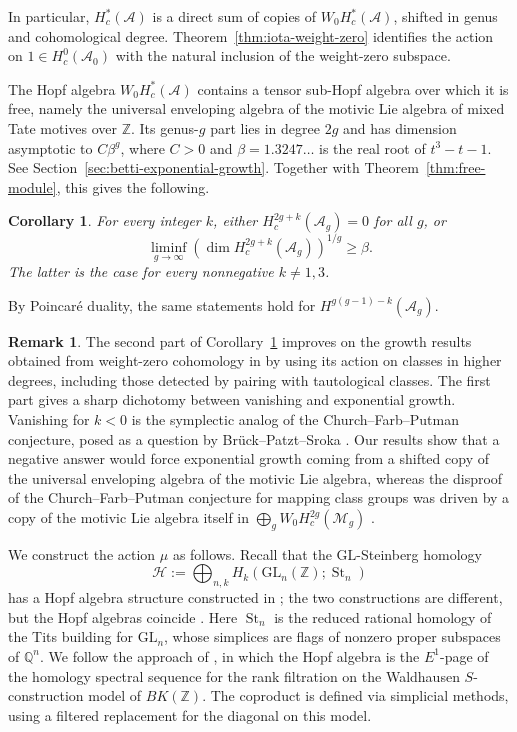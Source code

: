 \documentclass[12 pt]{amsart}
\newcommand{\QQ}{\mathbb{Q}}
\newcommand{\ZZ}{\mathbb{Z}}
\newcommand{\cA}{\mathcal{A}}
\newcommand{\cH}{\mathcal{H}}
\newcommand{\cM}{\mathcal{M}}
\newcommand{\St}{\operatorname{St}}
\newcommand{\GL}{\mathrm{GL}}
\newcommand{\<}{\langle}
\renewcommand{\>}{\rangle}
\newtheorem{corollary}[theorem]{Corollary}
\theoremstyle{definition}
\newtheorem{remark}[theorem]{Remark}
\begin{document}
\noindent In particular, $H_c^*(\cA)$ is a direct sum of copies of $W_0 H_c^*(\cA)$, shifted in genus and cohomological degree. Theorem~\ref{thm:iota-weight-zero} identifies the action on $1 \in H_c^0(\cA_0)$ with the natural inclusion of the weight-zero subspace.

The Hopf algebra $W_0 H_c^*(\cA)$ contains a tensor sub-Hopf algebra over which it is free, namely the universal enveloping algebra of the motivic Lie algebra of mixed Tate motives over $\ZZ$. Its genus-$g$ part lies in degree $2g$ and has dimension asymptotic to $C \beta^g$, where $C > 0$ and $\beta = 1.3247 \ldots$ is the real root of $t^3 - t - 1$. See Section~\ref{sec:betti-exponential-growth}. Together with Theorem~\ref{thm:free-module}, this gives the following.

\begin{corollary}\label{cor:betti-growth}
For every integer $k$, either $H_c^{2g + k}(\cA_g) = 0$ for all $g$, or
\[
\liminf_{g \to \infty}\left(\dim H_c^{2g + k}(\cA_g)\right)^{1/g} \geq \beta.
\]
The latter is the case for every nonnegative $k \neq 1, 3$.
\end{corollary}

\noindent By Poincar\'e duality, the same statements hold for $H^{g(g - 1) - k}(\cA_g)$.

\begin{remark}
The second part of Corollary~\ref{cor:betti-growth} improves on the growth results obtained from weight-zero cohomology in \cite{BCGP} by using its action on classes in higher degrees, including those detected by pairing with tautological classes. The first part gives a sharp dichotomy between vanishing and exponential growth. Vanishing for $k < 0$ is the symplectic analog of the Church--Farb--Putman conjecture, posed as a question by Br\"uck--Patzt--Sroka \cite[Question~1.1]{BPS}. Our results show that a negative answer would force exponential growth coming from a shifted copy of the universal enveloping algebra of the motivic Lie algebra, whereas the disproof of the Church--Farb--Putman conjecture for mapping class groups was driven by a copy of the motivic Lie algebra itself in $\bigoplus_g W_0 H_c^{2g}(\cM_g)$ \cite{CGP}.
\end{remark}

\bigskip

We construct the action $\mu$ as follows. Recall that the $\GL$-Steinberg homology
\[
\cH := \bigoplus_{n, k} H_k(\GL_n(\ZZ); \St_n)
\]
has a Hopf algebra structure constructed in \cite{AshMillerPatzt24, BCGP}; the two constructions are different, but the Hopf algebras coincide \cite[Theorem~1.1]{PalPayneComparison26}. Here $\St_n$ is the reduced rational homology of the Tits building for $\GL_n$, whose simplices are flags of nonzero proper subspaces of $\QQ^n$. We follow the approach of \cite{BCGP}, in which the Hopf algebra is the $E^1$-page of the homology spectral sequence for the rank filtration on the Waldhausen $S$-construction model of $BK(\ZZ)$. The coproduct is defined via simplicial methods, using a filtered replacement for the diagonal on this model.
\end{document}
